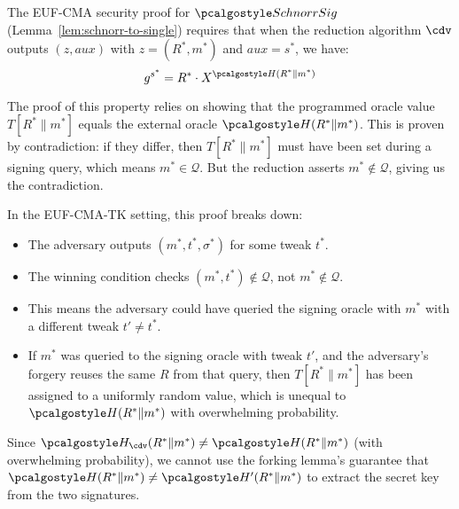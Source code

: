 \ifsolutions
\begin{mysolution}
  The EUF-CMA security proof for $\algo{SchnorrSig}$ (Lemma~\ref{lem:schnorr-to-single}) requires that when the reduction algorithm $\cdv$ outputs $(z, \mathit{aux})$ with $z = (R^*, m^*)$ and $\mathit{aux} = s^*$, we have:
  \[
    g^{s^*} = R^* \cdot X^{\algo{H}(R^* \| m^*)}
  \]
  
  The proof of this property relies on showing that the programmed oracle value $T[R^* \| m^*]$ equals the external oracle $\algo{H}(R^* \| m^*)$.
  This is proven by contradiction: if they differ, then $T[R^* \| m^*]$ must have been set during a signing query, which means $m^* \in \mathcal{Q}$.
  But the reduction asserts $m^* \notin \mathcal{Q}$, giving us the contradiction.
  
  In the EUF-CMA-TK setting, this proof breaks down:
  \begin{itemize}
    \item The adversary outputs $(m^*, t^*, \sigma^*)$ for some tweak $t^*$.
    \item The winning condition checks $(m^*, t^*) \notin \mathcal{Q}$, not $m^* \notin \mathcal{Q}$.
    \item This means the adversary could have queried the signing oracle with $m^*$ with a different tweak $t' \neq t^*$.
    \item If $m^*$ was queried to the signing oracle with tweak $t'$, and the adversary's forgery reuses the same $R$ from that query, then $T[R^* \| m^*]$ has been assigned to a uniformly random value, which is unequal to $\algo{H}(R^* \| m^*)$ with overwhelming probability.
  \end{itemize}
  
  Since $\algo{H}_{\cdv}(R^* \| m^*) \neq \algo{H}(R^* \| m^*)$ (with overwhelming probability), we cannot use the forking lemma's guarantee that $\algo{H}(R^* \| m^*) \neq \algo{H}'(R^* \| m^*)$ to extract the secret key from the two signatures.
\end{mysolution}
\fi

